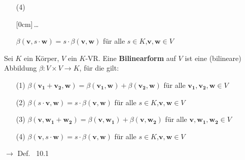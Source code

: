\documentclass[11pt]{article}
\renewcommand{\cite}[1]{\par\bigskip\hfill{\color{gray}\tiny\(\to\) #1}}
\renewcommand{\vec}[1]{\mathbf{#1}}
\newcommand{\hide}[1]{\parbox{0cm}{\raisebox{-7pt}[0cm]{\dots}}\color{white}#1\color{black}}
\let\olddots\dots
\renewcommand{\dots}{\,\olddots\,}
\newenvironment{field}{}{\newpage}
\newif\ifnote
\newenvironment{note}{\notetrue}{\notefalse}
\begin{document}
\begin{note}
\begin{field}
\begin{itemize}
        \item[(4)]\hide{\(\beta(\vec{v},s\cdot\vec{w}) = s\cdot\beta(\vec{v},\vec{w})\) für alle \(s\in K\),\(\vec{v},\vec{w}\in V\)}
    \end{itemize}
    \end{field}
    \begin{field}%
    Sei \(K\) ein Körper, \(V\) ein \(K\)-VR. Eine \textbf{Bilinearform} auf \(V\) ist eine (bilineare) Abbildung  \(\beta\colon V\times V \to K\), für die gilt:
    \begin{itemize}
        \item[(1)] \(\beta(\vec{v_1} + \vec{v_2}, \vec{w}) = \beta(\vec{v_1}, \vec{w}) + \beta(\vec{v_2}, \vec{w})\) für alle \(\vec{v_1, v_2, w} \in V\)
        \item[(2)] \(\beta(s\cdot\vec{v},\vec{w}) = s\cdot\beta(\vec{v},\vec{w})\) für alle \(s\in K\),\(\vec{v},\vec{w}\in V\)
        \item[(3)]\(\beta(\vec{v}, \vec{w_1} + \vec{w_2}) = \beta(\vec{v}, \vec{w_1}) + \beta(\vec{v}, \vec{w_2})\) für alle \(\vec{v, w_1, w_2} \in V\)
        \item[(4)]\(\beta(\vec{v},s\cdot\vec{w}) = s\cdot\beta(\vec{v},\vec{w})\) für alle \(s\in K\),\(\vec{v},\vec{w}\in V\)
    \end{itemize}
    \cite{Def. ~10.1}
    \end{field}
\end{note}
\end{document}
